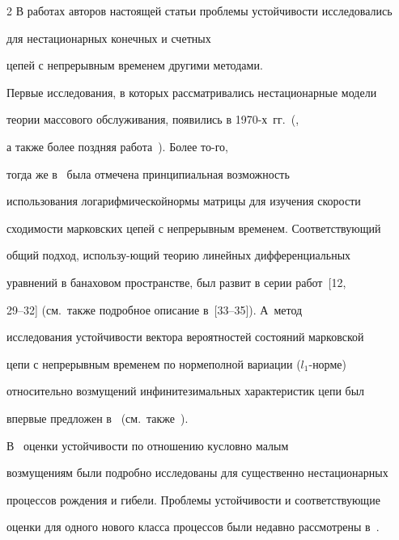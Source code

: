 \begin{multicols}{2}
В работах авторов настоящей статьи проблемы устойчивости исследовались

для нестационарных конечных и счетных

цепей с непрерывным временем другими методами.



Первые исследования, в которых рассматривались нестационарные модели

теории массового обслуживания, появились в 1970-х~гг.~(\cite{g1, g},

а также более поздняя работа~\cite{mw}). Более то-\linebreak го,

тогда же в~\cite{gm} была отмечена принципиальная возможность

использования логарифмической\linebreak нормы матрицы для изучения скорости

схо\-ди\-мости марковских цепей с непрерывным временем. Соответствующий

общий подход, использу-\linebreak ющий тео\-рию линейных дифференциальных\linebreak

уравнений в банаховом пространстве, был развит в серии работ~[12,

29--32] (см.\ также подробное описание в~[33--35]). А~метод

исследования устой\-чи\-вости вектора вероятностей состояний мар\-ковской

цепи с непрерывным временем по норме\linebreak полной вариации ($l_1$-нор\-ме)

относительно возмущений инфинитезимальных характеристик цепи был

впервые предложен в~\cite{z85} (см.\ так\-же~\cite{z88,z94}). %

В~\cite{z98} оценки устойчивости по отношению к\linebreak условно малым

возмущениям были подробно исследованы для существенно нестационарных\linebreak

процессов рождения и гибели. Проблемы устойчивости и соответствующие

оценки для одного нового класса процессов были недавно рас\-смот\-ре\-ны в~\cite{z12, z13c}.

{ %



}
\end{multicols}
